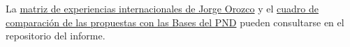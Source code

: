 \begingroup
\smallskip
{}
\label{ref:matriz-jorge}
\label{ref:comparacion-bases}
\noindent
La \href{https://github.com/oliverpardo1979/Informe-CJC-PND/blob/main/material_complementario/Matriz_politicas_IA_Jorge_Orozco_2026-10-21.xlsm}{matriz de experiencias internacionales de Jorge Orozco} y el \href{https://github.com/oliverpardo1979/Informe-CJC-PND/blob/main/material_complementario/Comparacion_Bases_PND_2026-11-13.md}{cuadro de comparación de las propuestas con las Bases del PND} pueden consultarse en el repositorio del informe.
\par\endgroup

